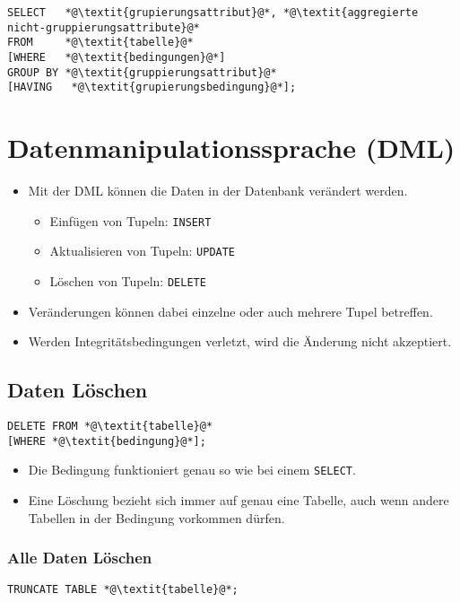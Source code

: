         	\begin{lstlisting}
SELECT   *@\textit{grupierungsattribut}@*, *@\textit{aggregierte nicht-gruppierungsattribute}@*
FROM     *@\textit{tabelle}@*
[WHERE   *@\textit{bedingungen}@*]
GROUP BY *@\textit{gruppierungsattribut}@*
[HAVING   *@\textit{grupierungsbedingung}@*];
        	\end{lstlisting}

    \section{Datenmanipulationssprache (DML)} %
        \begin{itemize}
        	\item Mit der DML können die Daten in der Datenbank verändert werden.
        		\begin{itemize}
        			\item Einfügen von Tupeln: \lstinline|INSERT|
        			\item Aktualisieren von Tupeln: \lstinline|UPDATE|
        			\item Löschen von Tupeln: \lstinline|DELETE|
        		\end{itemize}
        	\item Veränderungen können dabei einzelne oder auch mehrere Tupel betreffen.
        	\item Werden Integritätsbedingungen verletzt, wird die Änderung nicht akzeptiert.
        \end{itemize}

        \subsection{Daten Löschen} %
            \begin{lstlisting}
DELETE FROM *@\textit{tabelle}@*
[WHERE *@\textit{bedingung}@*];
            \end{lstlisting}
            
            \begin{itemize}
            	\item Die Bedingung funktioniert genau so wie bei einem \lstinline|SELECT|.
            	\item Eine Löschung bezieht sich immer auf genau eine Tabelle, auch wenn andere Tabellen in der Bedingung vorkommen dürfen.
            \end{itemize}

            \subsubsection{Alle Daten Löschen} %
                \begin{lstlisting}
TRUNCATE TABLE *@\textit{tabelle}@*;
                \end{lstlisting}
                
